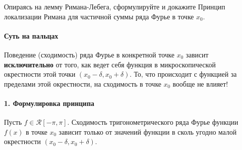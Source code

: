 {Опираясь на лемму Римана-Лебега, сформулируйте и докажите Принцип локализации Римана для частичной суммы ряда Фурье в точке $x_{0}$.}

\paragraph{Суть на пальцах}
Поведение (сходимость) ряда Фурье в конкретной точке $x_0$ зависит \textbf{исключительно} от того, как ведет себя функция в микроскопической окрестности этой точки $(x_0 - \delta, x_0 + \delta)$. То, что происходит с функцией за пределами этой окрестности, на сходимость в точке $x_0$ вообще не влияет!

\paragraph{1. Формулировка принципа}
Пусть $f \in \mathcal{R}[-\pi, \pi]$. Сходимость тригонометрического ряда Фурье функции $f(x)$ в точке $x_0$ зависит только от значений функции в сколь угодно малой окрестности $(x_0-\delta, x_0+\delta)$.

